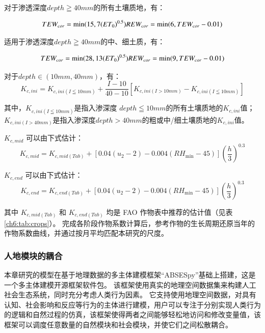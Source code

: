 对于渗透深度$depth \geqq 40mm$的所有土壤质地，有：

\begin{equation}
    TEW_{cor} = \min(15, 7 {(ET_0)}^{0.5}) \\
    REW_{cor} = \min(6, TEW_{cor} - 0.01)
\end{equation}

适用于渗透深度$depth \geqq 40mm$的中、细土质，有：

\begin{equation}
    TEW_{cor} = \min(28, 13{(ET_0)}^{0.5}) \\
    REW_{cor} = \min(9, TEW_{cor} - 0.01)
\end{equation}

对于$depth \in (10mm, 40mm)$，有：
\begin{equation}
    K_{c, ini} = K_{c, ini(I \leqq 10mm)} + \frac{I-10}{40-10}[K_{c, ini(I>10mm)} - K_{c, ini(I \leqq 10mm)}]
\end{equation}

其中，$K_{c, ini(I \leqq 10mm)}$是指入渗深度 $depth \leqq 10 mm$的所有土壤质地的$K_{c, ini}$值；$K_{c, ini(I > 40 mm)}$是指入渗深度$depth>40 mm$的粗或中/细土壤质地的$K_{c, ini}$值。

$K_{c, mid}$ 可以由下式估计：
\begin{equation}
    K_{c, mid} = K_{c, mid(Tab)} + [0.04(u_2 - 2) -0.004(RH_{\min} - 45)]{(\frac{h}{3})}^{0.3}
\end{equation}

$K_{c, end}$ 可以由下式估计：
\begin{equation}
    K_{c, end} = K_{c, end(Tab)} + [0.04(u_2 - 2) -0.004(RH_{\min} - 45)]{(\frac{h}{3})}^{0.3}
\end{equation}

其中 $K_{c, mid(Tab)}$ 和 $K_{c, end(Tab)}$ 均是 FAO 作物表中推荐的估计值（见表\ref{ch6:tab:crops}）。
完成各阶段作物系数计算后，参考作物的生长周期还原当年的作物系数曲线，并通过按月平均匹配本研究的尺度。

\subsubsection{人地模块的耦合}

本章研究的模型在基于地理数据的多主体建模框架“ABSESpy”基础上搭建，这是一个多主体建模开源框架软件包\cite{song2023}。
该框架使用真实的地理空间数据集来构建人工社会生态系统，同时充分考虑人类行为因素。
它支持使用地理空间数据，对具有认知、社会影响和反应等行为的主体进行建模，用户可以专注于分别实现人类行为的逻辑和自然过程的仿真，该框架使得两者之间能够轻松地访问和修改变量值，该框架可以调度任意数量的自然模块和社会模块，并使它们之间松散耦合。

